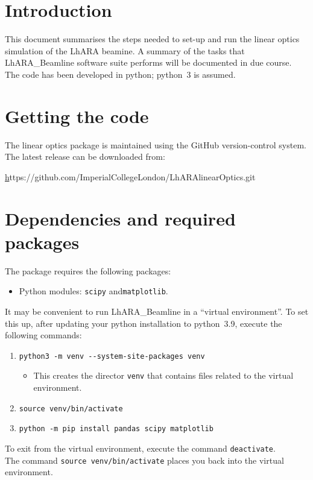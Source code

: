 \section*{Introduction}
This document summarises the steps needed to set-up and run
the linear optics simulation of the LhARA beamine.
A summary of the tasks that LhARA\_Beamline software suite performs
will be documented in due course.
The code has been developed in python; python~3 is assumed.

\section*{Getting the code}
The linear optics package is maintained using the GitHub
version-control system.
The latest release can be downloaded from: \\
\centerline{
  \href{https://github.com/ImperialCollegeLondon/LhARAlinearOptics.git}https://github.com/ImperialCollegeLondon/LhARAlinearOptics.git{}
}

\section*{Dependencies and required packages}
The package requires the following packages:
\begin{itemize}
  \item Python modules: \verb+scipy+ and\verb+matplotlib+. 
\end{itemize}
It may be convenient to run LhARA\_Beamline in a ``virtual environment''.
To set this up, after updating your python installation to python~3.9,
execute the following commands:
\begin{enumerate}
  \item \verb+python3 -m venv --system-site-packages venv+
    \begin{itemize}
      \item This creates the director \verb+venv+ that contains files
        related to the virtual environment.
    \end{itemize}
  \item \verb+source venv/bin/activate+
  \item \verb+python -m pip install pandas scipy matplotlib+
\end{enumerate}
To exit from the virtual environment, execute the command
\verb+deactivate+. \\
\noindent
The command \verb+source venv/bin/activate+ places you back
into the virtual environment.

